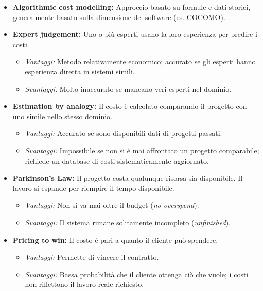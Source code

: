 \begin{itemize}
    \item \textbf{Algorithmic cost modelling:} Approccio basato su formule e dati storici, generalmente basato sulla dimensione del software (es. COCOMO).
    \item \textbf{Expert judgement:} Uno o più esperti usano la loro esperienza per predire i costi.
    \begin{itemize}
        \item \textit{Vantaggi:} Metodo relativamente economico; accurato se gli esperti hanno esperienza diretta in sistemi simili.
        \item \textit{Svantaggi:} Molto inaccurato se mancano veri esperti nel dominio.
    \end{itemize}
    \item \textbf{Estimation by analogy:} Il costo è calcolato comparando il progetto con uno simile nello stesso dominio.
    \begin{itemize}
        \item \textit{Vantaggi:} Accurato se sono disponibili dati di progetti passati.
        \item \textit{Svantaggi:} Impossibile se non si è mai affrontato un progetto comparabile; richiede un database di costi sistematicamente aggiornato.
    \end{itemize}
    \item \textbf{Parkinson's Law:} Il progetto costa qualunque risorsa sia disponibile. Il lavoro si espande per riempire il tempo disponibile.
    \begin{itemize}
        \item \textit{Vantaggi:} Non si va mai oltre il budget (\textit{no overspend}).
        \item \textit{Svantaggi:} Il sistema rimane solitamente incompleto (\textit{unfinished}).
    \end{itemize}
    \item \textbf{Pricing to win:} Il costo è pari a quanto il cliente può spendere.
    \begin{itemize}
        \item \textit{Vantaggi:} Permette di vincere il contratto.
        \item \textit{Svantaggi:} Bassa probabilità che il cliente ottenga ciò che vuole; i costi non riflettono il lavoro reale richiesto.
    \end{itemize}
\end{itemize}

